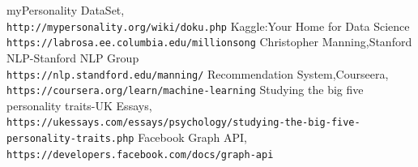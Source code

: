 \documentclass[a4paper,12pt]{article}
\begin{document}
%
%
\begin{thebibliography}{9}
		myPersonality DataSet,
	\\\texttt{http://mypersonality.org/wiki/doku.php}
		Kaggle:Your Home for Data Science
	\\\texttt{https://labrosa.ee.columbia.edu/millionsong}
	Christopher Manning,Stanford NLP-Stanford NLP Group
	\\\texttt{https://nlp.standford.edu/manning/}
	Recommendation System,Courseera,
	\\\texttt{https://coursera.org/learn/machine-learning}
	Studying the big five personality traits-UK Essays,
	\\\texttt{https://ukessays.com/essays/psychology/studying-the-big-five-personality-traits.php}
	Facebook Graph API,
	\\\texttt{https://developers.facebook.com/docs/graph-api}
\end{thebibliography}
\end{document}
